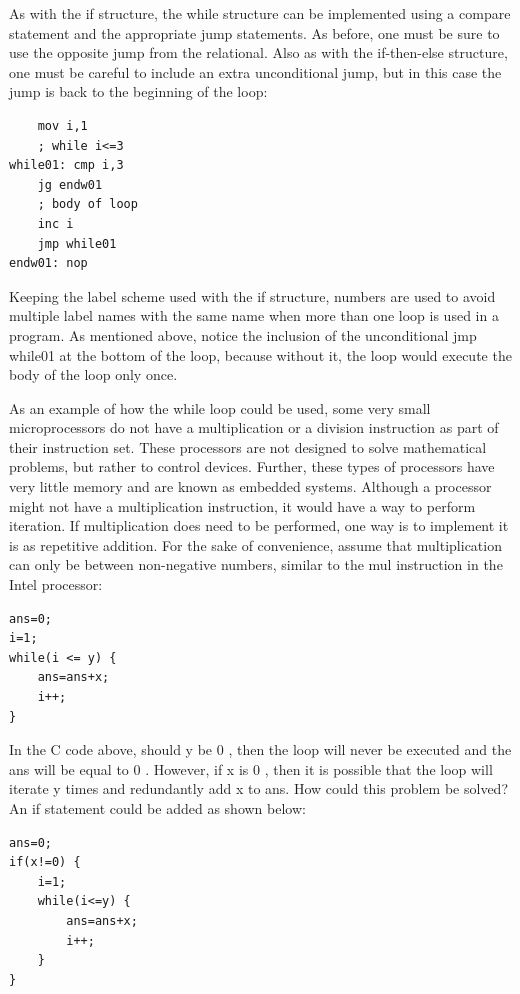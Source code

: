 \documentclass[10pt]{book}
\begin{document}
As with the if structure, the while structure can be implemented using a compare statement and the appropriate jump statements. As before, one must be sure to use the opposite jump from the relational. Also as with the if-then-else structure, one must be careful to include an extra unconditional jump, but in this case the jump is back to the beginning of the loop:

\begin{verbatim}
    mov i,1
    ; while i<=3
while01: cmp i,3
    jg endw01
    ; body of loop
    inc i
    jmp while01
endw01: nop
\end{verbatim}

Keeping the label scheme used with the if structure, numbers are used to avoid multiple label names with the same name when more than one loop is used in a program. As mentioned above, notice the inclusion of the unconditional jmp while01 at the bottom of the loop, because without it, the loop would execute the body of the loop only once.

As an example of how the while loop could be used, some very small microprocessors do not have a multiplication or a division instruction as part of their instruction set. These processors are not designed to solve mathematical problems, but rather to control devices. Further, these types of processors have very little memory and are known as embedded systems. Although a processor might not have a multiplication instruction, it would have a way to perform iteration. If multiplication does need to be performed, one way is to implement it is as repetitive addition. For the sake of convenience, assume that multiplication can only be between non-negative numbers, similar to the mul instruction in the Intel processor:

\begin{verbatim}
ans=0;
i=1;
while(i <= y) {
    ans=ans+x;
    i++;
}
\end{verbatim}

In the C code above, should y be 0 , then the loop will never be executed and the ans will be equal to 0 . However, if x is 0 , then it is possible that the loop will iterate y times and redundantly add x to ans. How could this problem be solved? An if statement could be added as shown below:


\begin{verbatim}
ans=0;
if(x!=0) {
    i=1;
    while(i<=y) {
        ans=ans+x;
        i++;
    }
}
\end{verbatim}
\end{document}
